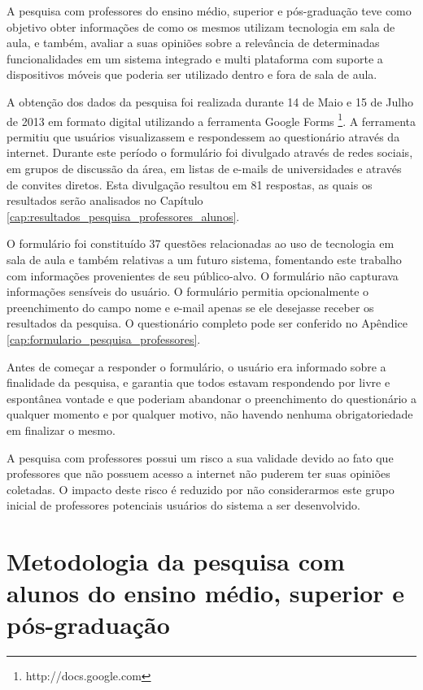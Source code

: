 A pesquisa com professores do ensino médio, superior e pós-graduação teve como objetivo obter informações de como os mesmos utilizam tecnologia em sala de aula, e também, avaliar a suas opiniões sobre a relevância de determinadas funcionalidades em um sistema integrado e multi plataforma com suporte a dispositivos móveis que poderia ser utilizado dentro e fora de sala de aula.

A obtenção dos dados da pesquisa foi realizada durante 14 de Maio e 15 de Julho de 2013 em formato digital utilizando a ferramenta Google Forms \footnote{http://docs.google.com}. A ferramenta permitiu que usuários visualizassem e respondessem ao questionário através da internet. Durante este período o formulário foi divulgado através de redes sociais, em grupos de discussão da área, em listas de e-mails de universidades e através de convites diretos. Esta divulgação resultou em 81 respostas, as quais os resultados serão analisados no Capítulo \ref{cap:resultados_pesquisa_professores_alunos}.

O formulário foi constituído 37 questões relacionadas ao uso de tecnologia em sala de aula e também relativas a um futuro sistema, fomentando este trabalho com informações provenientes de seu público-alvo. O formulário não capturava informações sensíveis do usuário. O formulário permitia opcionalmente o preenchimento do campo nome e e-mail apenas se ele desejasse receber os resultados da pesquisa. O questionário completo pode ser conferido no Apêndice \ref{cap:formulario_pesquisa_professores}.

Antes de começar a responder o formulário, o usuário era informado sobre a finalidade da pesquisa, e  garantia que todos estavam respondendo por livre e espontânea vontade e que poderiam abandonar o preenchimento do questionário a qualquer momento e por qualquer motivo, não havendo nenhuma obrigatoriedade em finalizar o mesmo.

A pesquisa com professores possui um risco a sua validade devido ao fato que professores que não possuem acesso a internet não puderem ter suas opiniões coletadas. O impacto deste risco é reduzido por não considerarmos este grupo inicial de professores potenciais usuários do sistema a ser desenvolvido.


\section{Metodologia da pesquisa com alunos do ensino médio, superior e pós-graduação}
\label{sec:metodologia_alunos}

